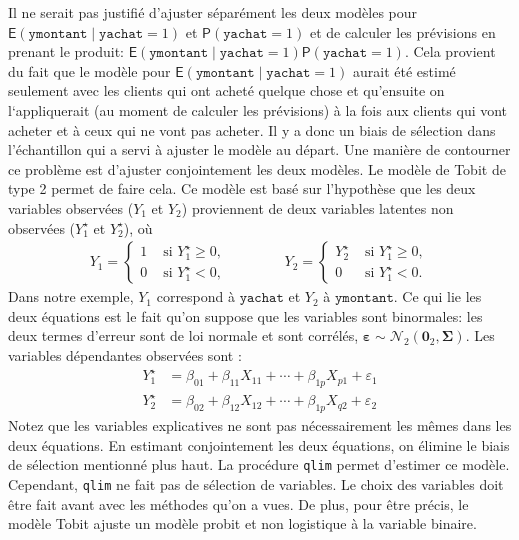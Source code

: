 \documentclass[
  11pt,
  letterpaper,
]{book}
\theoremstyle{definition}
\theoremstyle{definition}
\theoremstyle{definition}
\theoremstyle{definition}
\theoremstyle{remark}
\begin{document}
Il ne serait pas justifié d'ajuster séparément les deux modèles pour \({\mathsf E}\left(\texttt{ymontant} \mid \texttt{yachat}=1\right)\) et \({\mathsf P}\left(\texttt{yachat}=1\right)\) et de calculer les prévisions en prenant le produit: \({\mathsf E}\left(\texttt{ymontant} \mid \texttt{yachat}=1\right){\mathsf P}\left(\texttt{yachat}=1\right)\). Cela provient du fait que le modèle pour \({\mathsf E}\left(\texttt{ymontant} \mid \texttt{yachat}=1\right)\) aurait été estimé seulement avec les clients qui ont acheté quelque chose et qu'ensuite on l`appliquerait (au moment de calculer les prévisions) à la fois aux clients qui vont acheter et à ceux qui ne vont pas acheter. Il y a donc un biais de sélection dans l'échantillon qui a servi à ajuster le modèle au départ. Une manière de contourner ce problème est d'ajuster conjointement les deux modèles. Le modèle de Tobit de type 2 permet de faire cela. Ce modèle est basé sur l'hypothèse que les deux variables observées (\(Y_1\) et \(Y_2\)) proviennent de deux variables latentes non observées (\(Y_1^{\star}\) et \(Y_2^{\star}\)), où
\begin{align*}
Y_1 = \begin{cases}
1 & \text{ si } Y_1^{\star} \ge 0, \\
0 & \text{ si } Y_1^{\star} < 0,
\end{cases}
\qquad \qquad 
Y_2 = \begin{cases}
Y_2^{\star} & \text{ si } Y_1^{\star} \ge 0, \\
0 & \text{ si } Y_1^{\star} < 0.
\end{cases}
\end{align*}
Dans notre exemple, \(Y_1\) correspond à \(\texttt{yachat}\) et \(Y_2\) à \(\texttt{ymontant}\).
Ce qui lie les deux équations est le fait qu'on suppose que les variables sont binormales: les deux termes d'erreur sont de loi normale et sont corrélés, \(\boldsymbol{\varepsilon} \sim \mathcal{N}_2(\boldsymbol{0}_2, \boldsymbol{\Sigma})\). Les variables dépendantes observées sont :
\begin{align*}
Y_{1}^{\star} &= \beta_{01} + \beta_{11} X_{11} + \cdots + \beta_{1p}X_{p1} + \varepsilon_{1}\\
Y_{2}^{\star} &= \beta_{02} + \beta_{12} X_{12} + \cdots + \beta_{1p}X_{q2} + \varepsilon_{2}
\end{align*}
Notez que les variables explicatives ne sont pas nécessairement les mêmes dans les deux équations. En estimant conjointement les deux équations, on élimine le biais de sélection mentionné plus haut. La procédure \texttt{qlim} permet d'estimer ce modèle. Cependant, \texttt{qlim} ne fait pas de sélection de variables. Le choix des variables doit être fait avant avec les méthodes qu'on a vues. De plus, pour être précis, le modèle Tobit ajuste un modèle probit et non logistique à la variable binaire.
\end{document}
